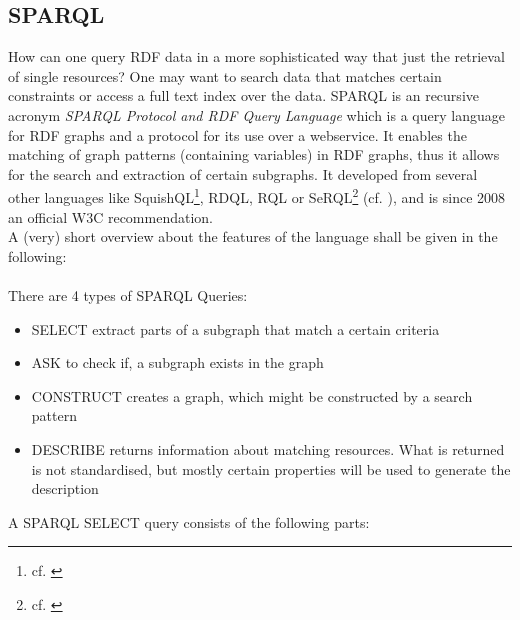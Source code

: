 \subsection{SPARQL} \label{sec:sparql}
How can one query RDF data in a more sophisticated way that just the retrieval of single resources? One may want to search data that matches certain constraints or access a full text index over the data.
SPARQL is an recursive acronym \emph{SPARQL Protocol and RDF Query Language} which is a query language for RDF graphs and a protocol for its use over a webservice. It enables the matching of graph patterns (containing variables) in RDF graphs, thus it allows for the search and extraction of certain subgraphs. It developed from several other languages like SquishQL\footnote{cf. \cite{squishQL}}, RDQL, RQL or SeRQL\footnote{cf. \cite{serql}} (cf. \cite{compQL}), and is since 2008 an official W3C recommendation.\\
A (very) short overview about the features of the language shall be given in the following:\\
\vspace{0.1cm}\\
There are 4 types of SPARQL Queries:
\begin{itemize}
	\item{SELECT extract parts of a subgraph that match a certain criteria}
	\item{ASK to check if, a subgraph exists in the graph}
	\item{CONSTRUCT creates a graph, which might be constructed by a search pattern}
	\item{DESCRIBE returns information about matching resources. What is returned is not standardised, but mostly certain properties will be used to generate the description}
\end{itemize}
A SPARQL SELECT query consists of the following parts:
